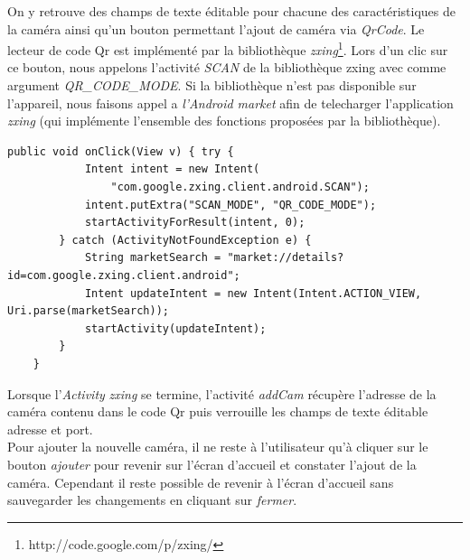 On y retrouve des champs de texte éditable pour chacune
des caractéristiques de la caméra ainsi qu'un bouton permettant l'ajout de caméra via \textit{QrCode}.\newline
\indent Le lecteur de code Qr est implémenté par la bibliothèque
\textit{zxing}\footnote{\label{zxing} http://code.google.com/p/zxing/}. \newline
Lors d'un clic sur ce bouton, nous appelons l'activité 
\textit{SCAN} de la bibliothèque zxing avec comme argument
\textit{QR\_CODE\_MODE}.\newline
Si la bibliothèque n'est pas disponible sur l'appareil, nous faisons appel a
\textit{l'Android market} afin de telecharger   l'application \textit{zxing} (qui
implémente l'ensemble des fonctions proposées par la bibliothèque).
\newpage
\begin{lstlisting}[caption={Lancement de l'activité zxing ou de l'Android
market.}] 
    public void onClick(View v) { try {
            Intent intent = new Intent(
                "com.google.zxing.client.android.SCAN");
            intent.putExtra("SCAN_MODE", "QR_CODE_MODE");
            startActivityForResult(intent, 0);
        } catch (ActivityNotFoundException e) {
            String marketSearch = "market://details?id=com.google.zxing.client.android";
            Intent updateIntent = new Intent(Intent.ACTION_VIEW, Uri.parse(marketSearch));
            startActivity(updateIntent);
        }
    }
\end{lstlisting}

\indent \newline
\indent Lorsque l'\textit{Activity} \textit{zxing} se termine, l'activité
\textit{addCam} récupère l'adresse de la caméra contenu dans le code Qr puis verrouille les
champs de texte éditable adresse et port.\\
\indent Pour ajouter la nouvelle
caméra, il ne reste à l'utilisateur qu'à cliquer sur le bouton
\textit{ajouter} pour revenir sur l'écran d'accueil et constater l'ajout de la caméra. Cependant il reste possible de revenir à l'écran d'accueil sans sauvegarder les changements en cliquant sur \textit{fermer}.

